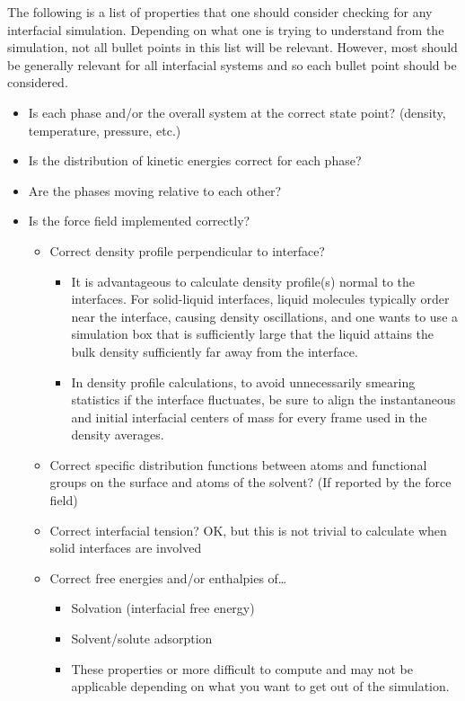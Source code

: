 \documentclass[9pt]{livecoms}
\begin{document}
	The following is a list of properties that one should consider checking for any interfacial simulation. 
Depending on what one is trying to understand from the simulation, not all bullet points in this list will be relevant. 
However, most should be generally relevant for all interfacial systems and so each bullet point should be considered.
\begin{itemize}
	\item Is each phase and/or the overall system at the correct state point? (density, temperature, pressure, etc.)
	\item Is the distribution of kinetic energies correct for each phase?
	\item Are the phases moving relative to each other?
	\item Is the force field implemented correctly?
	\begin{itemize}
		\item Correct density profile perpendicular to interface?
		\begin{itemize}
			\item It is advantageous to calculate density profile(s) normal to the interfaces. 
			For solid-liquid interfaces, liquid molecules typically order near the interface, causing density oscillations, and one wants to use a simulation box that is sufficiently large that the liquid attains the bulk density sufficiently far away from the interface.
			\item In density profile calculations, to avoid unnecessarily smearing statistics if the interface fluctuates, be sure to align the instantaneous and initial interfacial centers of mass for every frame used in the density averages.
		\end{itemize}
		\item Correct specific distribution functions between atoms and functional groups on the surface and atoms of the solvent? 
		(If reported by the force field)
		\item Correct interfacial tension? OK, but this is not trivial to calculate when solid interfaces are involved
		\item Correct free energies and/or enthalpies of…
		\begin{itemize}
			\item Solvation (interfacial free energy)
			\item Solvent/solute adsorption
			\item These properties or more difficult to compute and may not be applicable depending on what you want to get out of the simulation. 

\end{itemize}
\end{itemize}
\end{itemize}
\end{document}
